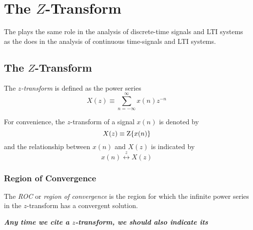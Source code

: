 \section{The \texorpdfstring{$Z$-Transform}{Z-Transform}}\label{sec:Z-Transform}
The  plays the same role in the analysis of discrete-time signals and LTI systems as the  does in the analysis of continuous time-signals and LTI systems.

\subsection{The \texorpdfstring{$Z$-Transform}{Z-Transform}}\label{subsec:Z-Transform}
\begin{definition}[$Z$-Transform]\label{def:Z-Transform}
  The \emph{$z$-transform} is defined as the power series
  \begin{equation}\label{eq:Z-Transform}
    X(z) \equiv \sum_{n=-\infty}^{\infty} x(n)z^{-n}
  \end{equation}

  \begin{remark}
    For convenience, the $z$-transform of a signal $x(n)$ is denoted by
    \begin{equation}\label{eq:Z-Transform Representation}
      X(z) \equiv \operatorname{Z} \lbrace x(n) \rbrace
    \end{equation}
    and the relationship between $x(n)$ and $X(z)$ is indicated by
    \begin{equation}\label{eq:Z-Transform Relationship}
      x(n) \overset{z}{\leftrightarrow} X(z)
    \end{equation}
  \end{remark}
\end{definition}

\subsubsection{Region of Convergence}\label{subsubsec:ROC}
\begin{definition}[ROC]\label{def:ROC}
  The \emph{ROC} or \emph{region of convergence} is the region for which the infinite power series in the $z$-transform has a convergent solution.
  \begin{remark}
    \textbf{\emph{Any time we cite a $z$-transform, we should also indicate its }}
  \end{remark}
\end{definition}

